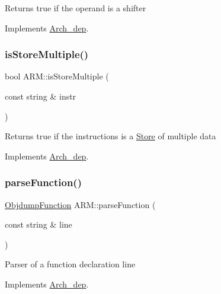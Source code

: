 Returns true if the operand is a shifter 

Implements \hyperlink{classArch__dep_ad56e95263903d54aabbb91efdcf7eba4}{Arch\+\_\+dep}.

\mbox{\label{classARM_a2c8848aa0ead5e445c3f637d527fae03}} 
\subsubsection{\texorpdfstring{is\+Store\+Multiple()}{isStoreMultiple()}}
{\footnotesize\ttfamily bool A\+R\+M\+::is\+Store\+Multiple (\begin{DoxyParamCaption}\item[{const string \&}]{instr }\end{DoxyParamCaption})\hspace{0.3cm}{\ttfamily [virtual]}}

Returns true if the instructions is a \hyperlink{classStore}{Store} of multiple data 

Implements \hyperlink{classArch__dep_a54438a476a16d55659124aea0c38397a}{Arch\+\_\+dep}.

\mbox{\label{classARM_a0f6b3ef390259fd4754cab9752609a20}} 
\subsubsection{\texorpdfstring{parse\+Function()}{parseFunction()}}
{\footnotesize\ttfamily \hyperlink{classObjdumpFunction}{Objdump\+Function} A\+R\+M\+::parse\+Function (\begin{DoxyParamCaption}\item[{const string \&}]{line }\end{DoxyParamCaption})\hspace{0.3cm}{\ttfamily [virtual]}}

Parser of a function declaration line 

Implements \hyperlink{classArch__dep_a5d004c41d6eaf7975b69f767a52d2e30}{Arch\+\_\+dep}.

\mbox{\label{classARM_a386a5c3f261a13e7b4a5cd4a5b08f289}} 
